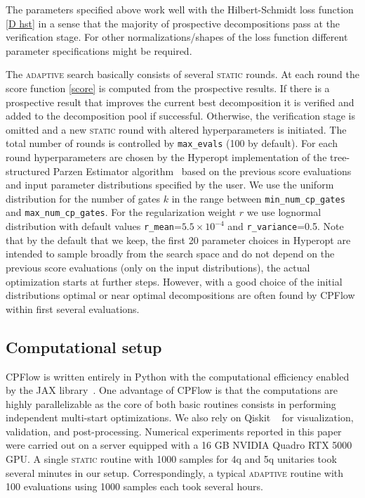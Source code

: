 \documentclass[twocolumn, amsfonts, amssymb, aps, nofootinbib]{revtex4-2}
\newcommand{\package}[1]{\textrm {#1 }}
\newcommand{\cpflow}{\package{CPFlow}}
\newcommand{\static}{\textsc{static }}
\newcommand{\adaptive}{\textsc{adaptive }}
\newcommand{\param}[1]{\texttt{#1}}
\begin{document}
The parameters specified above work well with the Hilbert-Schmidt loss function \eqref{D hst} in a sense that the majority of prospective decompositions pass at the verification stage. For other normalizations/shapes of the loss function different parameter specifications might be required.

The \adaptive search basically consists of several \static rounds. At each round the score function \eqref{score}  is computed from the prospective results. If there is a prospective result that improves the current best decomposition it is verified and added to the decomposition pool if successful. Otherwise, the verification stage is omitted and a new \static round with altered hyperparameters is initiated. The total number of rounds is controlled by \param{max\_evals} (100 by default). For each round hyperparameters are chosen by the \package{Hyperopt} implementation of the tree-structured Parzen Estimator algorithm~\cite{hyperopt} based on the previous score evaluations and input parameter distributions specified by the user. We use the uniform distribution for the number of gates $k$ in the range between \param{min\_num\_cp\_gates} and \param{max\_num\_cp\_gates}. For the regularization weight $r$ we use lognormal distribution with default values \param{r\_mean}=$5.5\times10^{-4}$ and \param{r\_variance}=0.5. Note that by the default that we keep, the first 20 parameter choices in Hyperopt are intended to sample broadly from the search space and do not depend on the previous score evaluations (only on the input distributions), the actual optimization starts at further steps. However, with a good choice of the initial distributions optimal or near optimal decompositions are often found by \cpflow within first several evaluations.
\subsection{Computational setup \label{server}}
\cpflow \cite{cpflow} is written entirely in Python with the computational efficiency enabled by the \package{JAX} library~\cite{jax2018github}. One advantage of \cpflow is that the computations are highly parallelizable as the core of both basic routines consists in performing independent multi-start optimizations. We also rely on \package{Qiskit}~\cite{Qiskit} for visualization, validation, and post-processing. Numerical experiments reported in this paper  were carried out on a server equipped with a 16 GB NVIDIA Quadro RTX 5000 GPU. A single \static routine with 1000 samples for 4q and 5q unitaries took several minutes in our setup.  Correspondingly, a typical \adaptive routine with 100 evaluations using 1000 samples each took several hours.
\end{document}
